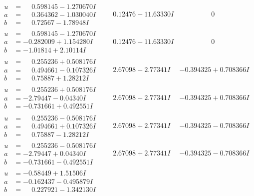 \documentclass[1p]{elsarticle_modified}
\theoremstyle{definition}
\begin{document}
$$\begin{array}{c|c|c}
\begin{aligned}
u &= \phantom{-}0.598145 - 1.270670 I \\
a &= \phantom{-}0.364362 - 1.030040 I \\
b &= \phantom{-}0.72567 - 1.78948 I\end{aligned}
 & \phantom{-}0.12476 - 11.63330 I & \phantom{-0.000000 } 0 \\ \hline\begin{aligned}
u &= \phantom{-}0.598145 - 1.270670 I \\
a &= -0.282009 + 1.154280 I \\
b &= -1.01814 + 2.10114 I\end{aligned}
 & \phantom{-}0.12476 - 11.63330 I & \phantom{-0.000000 } 0 \\ \hline\begin{aligned}
u &= \phantom{-}0.255236 + 0.508176 I \\
a &= \phantom{-}0.494661 - 0.107326 I \\
b &= \phantom{-}0.75887 + 1.28212 I\end{aligned}
 & \phantom{-}2.67098 - 2.77341 I & -0.394325 + 0.708366 I \\ \hline\begin{aligned}
u &= \phantom{-}0.255236 + 0.508176 I \\
a &= -2.79447 - 0.04340 I \\
b &= -0.731661 + 0.492551 I\end{aligned}
 & \phantom{-}2.67098 - 2.77341 I & -0.394325 + 0.708366 I \\ \hline\begin{aligned}
u &= \phantom{-}0.255236 - 0.508176 I \\
a &= \phantom{-}0.494661 + 0.107326 I \\
b &= \phantom{-}0.75887 - 1.28212 I\end{aligned}
 & \phantom{-}2.67098 + 2.77341 I & -0.394325 - 0.708366 I \\ \hline\begin{aligned}
u &= \phantom{-}0.255236 - 0.508176 I \\
a &= -2.79447 + 0.04340 I \\
b &= -0.731661 - 0.492551 I\end{aligned}
 & \phantom{-}2.67098 + 2.77341 I & -0.394325 - 0.708366 I \\ \hline\begin{aligned}
u &= -0.58449 + 1.51506 I \\
a &= -0.162437 - 0.495879 I \\
b &= \phantom{-}0.227921 - 1.342130 I\end{aligned}

\end{array}$$
\end{document}
